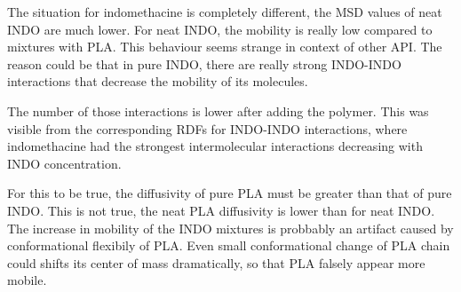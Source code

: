 The situation for indomethacine is completely different, the MSD values of neat INDO are much lower. For neat INDO, the mobility is really low compared to mixtures with PLA. This behaviour seems strange in context of other API. The reason could be that in pure INDO, there are really strong INDO-INDO interactions that decrease the mobility of its molecules. 

The number of those interactions is lower after adding the polymer. This was visible from the corresponding RDFs for INDO-INDO interactions, where indomethacine had the strongest intermolecular interactions decreasing with INDO concentration. 

For this to be true, the diffusivity of pure PLA must be greater than that of pure INDO. This is not true, the neat PLA diffusivity is lower than for neat INDO. The increase in mobility of the INDO mixtures is probbably an artifact caused by conformational flexibily of PLA. Even small conformational change of PLA chain could shifts its center of mass dramatically, so that PLA falsely appear more mobile.  

